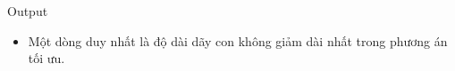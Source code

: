 Output
\begin{itemize}
	\item     Một dòng duy nhất là độ dài dãy con không giảm dài nhất trong phương án tối ưu.   
\end{itemize}